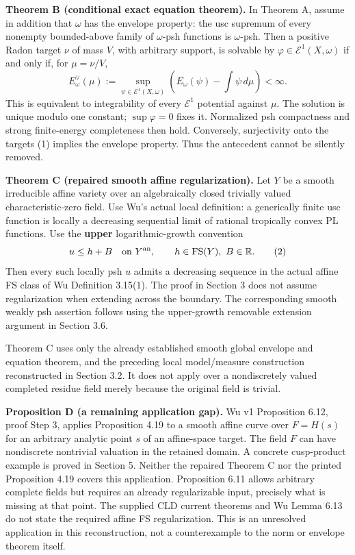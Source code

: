 \documentclass[
  11pt,
]{article}
\begin{document}
\textbf{Theorem B (conditional exact equation theorem).} In Theorem A,
assume in addition that \(\omega\) has the envelope property: the usc
supremum of every nonempty bounded-above family of \(\omega\)-psh
functions is \(\omega\)-psh. Then a positive Radon target \(\nu\) of
mass \(V\), with arbitrary support, is solvable by
\(\varphi\in\mathcal E^1(X,\omega)\) if and only if, for \(\mu=\nu/V\),
\[
 E^\vee_\omega(\mu):=\sup_{\psi\in\mathcal E^1(X,\omega)}
 \left(E_\omega(\psi)-\int\psi\,d\mu\right)<\infty.
 \tag{1}
\] This is equivalent to integrability of every \(\mathcal E^1\)
potential against \(\mu\). The solution is unique modulo one constant;
\(\sup\varphi=0\) fixes it. Normalized psh compactness and strong
finite-energy completeness then hold. Conversely, surjectivity onto the
targets (1) implies the envelope property. Thus the antecedent cannot be
silently removed.

\textbf{Theorem C (repaired smooth affine regularization).} Let \(Y\) be
a smooth irreducible affine variety over an algebraically closed
trivially valued characteristic-zero field. Use Wu's actual local
definition: a generically finite usc function is locally a decreasing
sequential limit of rational tropically convex PL functions. Use the
\textbf{upper} logarithmic-growth convention \[
 u\leq h+B\quad\hbox{on }Y^{\rm an},\qquad h\in\operatorname{FS}(Y),\ B\in\mathbb R.
 \tag{2}
\] Then every such locally psh \(u\) admits a decreasing sequence in the
actual affine FS class of Wu Definition 3.15(1). The proof in Section 3
does not assume regularization when extending across the boundary. The
corresponding smooth weakly psh assertion follows using the upper-growth
removable extension argument in Section 3.6.

Theorem C uses only the already established smooth global envelope and
equation theorem, and the preceding local model/measure construction
reconstructed in Section 3.2. It does not apply over a nondiscretely
valued completed residue field merely because the original field is
trivial.

\textbf{Proposition D (a remaining application gap).} Wu v1 Proposition
6.12, proof Step 3, applies Proposition 4.19 to a smooth affine curve
over \(F=H(s)\) for an arbitrary analytic point \(s\) of an affine-space
target. The field \(F\) can have nondiscrete nontrivial valuation in the
retained domain. A concrete cusp-product example is proved in Section 5.
Neither the repaired Theorem C nor the printed Proposition 4.19 covers
this application. Proposition 6.11 allows arbitrary complete fields but
requires an already regularizable input, precisely what is missing at
that point. The supplied CLD current theorems and Wu Lemma 6.13 do not
state the required affine FS regularization. This is an unresolved
application in this reconstruction, not a counterexample to the norm or
envelope theorem itself.
\end{document}
